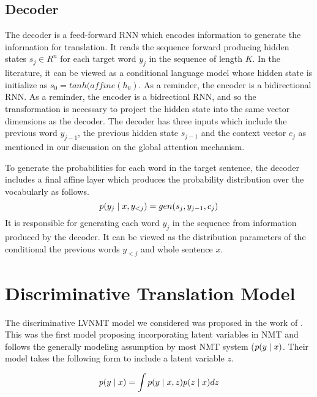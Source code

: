  




\subsection{Decoder}


The decoder is a feed-forward \ac{RNN} which encodes information to generate the information for translation. It reads the sequence forward producing hidden states $s_{j} \in R^{n}$ for each target word $y_{j}$ in the sequence of length $K$. In the literature, it can be viewed as a conditional language model \cite{koehn2017NMT} whose hidden state is initialize as $s_{0} = tanh(affine(h_{0})$. As a reminder, the encoder is a bidirectional \ac{RNN}. As a reminder, the encoder is a bidrectionl \ac{RNN}, and so the transformation is necessary to project the hidden state into the same vector dimensions as the decoder. The decoder has three inputs which include the previous word $y_{j-1}$, the previous hidden state $s_{j-1}$ and the context vector $c_{j}$ as mentioned in our discussion on the global attention mechanism. 

To generate the probabilities for each word in the target sentence, the decoder includes a final affine layer which produces the probability distribution over the vocabularly as follows.
\begin{equation}
p(y_{j} \; | \;{x, y_{<j}}) = gen(s_{j}, y_{j-1}, c_{j})
\end{equation}
It is responsible for generating each word $y_{j}$ in the sequence from information produced by the decoder. It can be viewed as the distribution parameters of the conditional the previous words $y_{<j}$ and whole sentence $x$.


\section{Discriminative Translation Model}


The discriminative \ac{LVNMT} model we considered was proposed in the work of \citet{Zhang2016VNMT}. This was the first model proposing incorporating latent variables in \ac{NMT} and follows the generally modeling assumption by most \ac{NMT} system ($p(y \; | \;{x})$.  Their model takes the following form to include a latent variable $z$. 

\begin{equation}
p(y \; | \;{x})  = \int p(y \; | \;{x,z}) p(z \; | \;{x}) dz
\end{equation}

